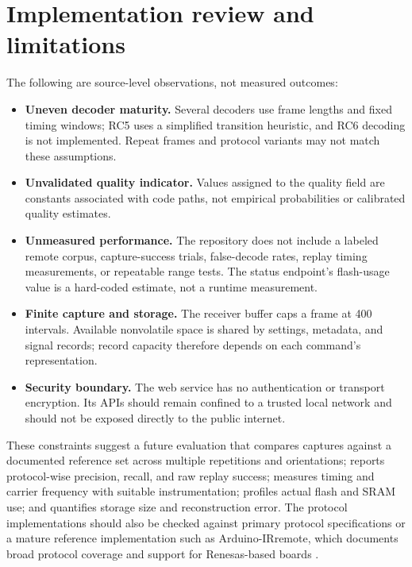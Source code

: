 \documentclass[11pt]{article}
\begin{document}
\section{Implementation review and limitations}
The following are source-level observations, not measured outcomes:
\begin{itemize}
  \item \textbf{Uneven decoder maturity.} Several decoders use frame lengths and fixed timing windows; RC5 uses a simplified transition heuristic, and RC6 decoding is not implemented. Repeat frames and protocol variants may not match these assumptions.
  \item \textbf{Unvalidated quality indicator.} Values assigned to the quality field are constants associated with code paths, not empirical probabilities or calibrated quality estimates.
  \item \textbf{Unmeasured performance.} The repository does not include a labeled remote corpus, capture-success trials, false-decode rates, replay timing measurements, or repeatable range tests. The status endpoint's flash-usage value is a hard-coded estimate, not a runtime measurement.
  \item \textbf{Finite capture and storage.} The receiver buffer caps a frame at 400 intervals. Available nonvolatile space is shared by settings, metadata, and signal records; record capacity therefore depends on each command's representation.
  \item \textbf{Security boundary.} The web service has no authentication or transport encryption. Its APIs should remain confined to a trusted local network and should not be exposed directly to the public internet.
\end{itemize}

These constraints suggest a future evaluation that compares captures against a documented reference set across multiple repetitions and orientations; reports protocol-wise precision, recall, and raw replay success; measures timing and carrier frequency with suitable instrumentation; profiles actual flash and SRAM use; and quantifies storage size and reconstruction error. The protocol implementations should also be checked against primary protocol specifications or a mature reference implementation such as Arduino-IRremote, which documents broad protocol coverage and support for Renesas-based boards \citep{arduinoIRremote}.
\end{document}
